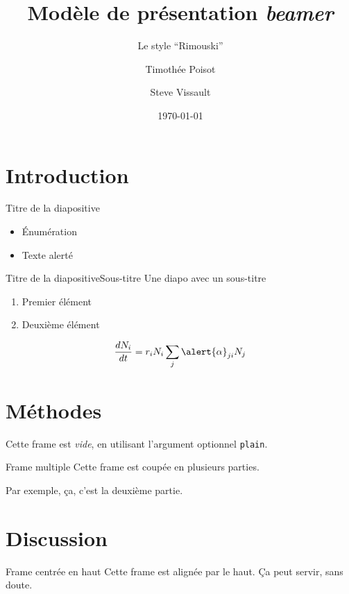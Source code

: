 \documentclass{eecslides}
\title[Modèle \emph{beamer}]{Modèle de présentation \emph{beamer}}
\subtitle{Le style ``Rimouski''}
\author[Tim \& Steve]{Timothée Poisot \and Steve Vissault}
\institute[Chaire de recherche EEC]{UQAR -- \emph{Theoretical Ecosystem Ecology}}
\date{\today} %
\begin{document}
	\begin{frame}[plain]
		\titlepage
	\end{frame}

	\section{Introduction}

	\begin{frame}{Titre de la diapositive}
	    
		\begin{itemize}
			\item Énumération
			\item Texte \alert{alerté} 
		\end{itemize}
	
	\end{frame}

	\begin{frame}{Titre de la diapositive}{Sous-titre}
		Une diapo avec un sous-titre

		\begin{enumerate}
			\item Premier élément
			\item Deuxième élément
		\end{enumerate}

		$$\frac{dN_i}{dt} = r_iN_i\sum_j\alert{\alpha}_{ji}N_j$$

	\end{frame}

	\section{Méthodes}

	\begin{frame}[plain]
		Cette frame est \emph{vide}, en utilisant l'argument optionnel \texttt{plain}.
	\end{frame}

	\begin{frame}[allowframebreaks]{Frame multiple}
		Cette frame est coupée en plusieurs parties.

		\framebreak

		Par exemple, ça, c'est la deuxième partie.
	\end{frame}

	\section{Discussion}

	\begin{frame}[t]{Frame centrée en haut}
	    Cette frame est alignée par le haut. Ça peut servir, sans doute.	
	\end{frame}
\end{document}
